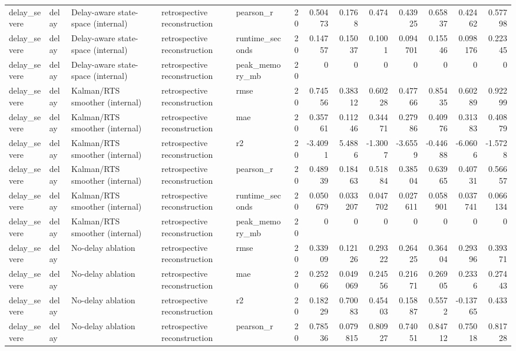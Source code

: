 \begin{table}[!htbp]
{{\begin{tabular}{lllllrrrrrrrr}
delay_severe & delay & Delay-aware state-space (internal) & retrospective reconstruction & pearson_r & 20 & 0.50473 & 0.1768 & 0.474 & 0.43925 & 0.65837 & 0.42462 & 0.57798 \\
delay_severe & delay & Delay-aware state-space (internal) & retrospective reconstruction & runtime_seconds & 20 & 0.14757 & 0.15037 & 0.1001 & 0.094701 & 0.15546 & 0.098176 & 0.22345 \\
delay_severe & delay & Delay-aware state-space (internal) & retrospective reconstruction & peak_memory_mb & 20 & 0 & 0 & 0 & 0 & 0 & 0 & 0 \\
delay_severe & delay & Kalman/RTS smoother (internal) & retrospective reconstruction & rmse & 20 & 0.74556 & 0.38312 & 0.60228 & 0.47766 & 0.85435 & 0.60289 & 0.92299 \\
delay_severe & delay & Kalman/RTS smoother (internal) & retrospective reconstruction & mae & 20 & 0.35761 & 0.11246 & 0.34471 & 0.27986 & 0.40976 & 0.31383 & 0.40879 \\
delay_severe & delay & Kalman/RTS smoother (internal) & retrospective reconstruction & r2 & 20 & -3.4091 & 5.4886 & -1.3007 & -3.6559 & -0.44688 & -6.0606 & -1.5728 \\
delay_severe & delay & Kalman/RTS smoother (internal) & retrospective reconstruction & pearson_r & 20 & 0.48939 & 0.18463 & 0.51884 & 0.38504 & 0.63965 & 0.40731 & 0.56657 \\
delay_severe & delay & Kalman/RTS smoother (internal) & retrospective reconstruction & runtime_seconds & 20 & 0.050679 & 0.033207 & 0.047702 & 0.027611 & 0.058901 & 0.037741 & 0.066134 \\
delay_severe & delay & Kalman/RTS smoother (internal) & retrospective reconstruction & peak_memory_mb & 20 & 0 & 0 & 0 & 0 & 0 & 0 & 0 \\
delay_severe & delay & No-delay ablation & retrospective reconstruction & rmse & 20 & 0.33909 & 0.12126 & 0.29322 & 0.26425 & 0.36404 & 0.29396 & 0.39371 \\
delay_severe & delay & No-delay ablation & retrospective reconstruction & mae & 20 & 0.25266 & 0.049069 & 0.24556 & 0.21671 & 0.26905 & 0.2336 & 0.27443 \\
delay_severe & delay & No-delay ablation & retrospective reconstruction & r2 & 20 & 0.18229 & 0.70083 & 0.45403 & 0.15887 & 0.5572 & -0.13765 & 0.433 \\
delay_severe & delay & No-delay ablation & retrospective reconstruction & pearson_r & 20 & 0.78536 & 0.079815 & 0.80927 & 0.74051 & 0.84712 & 0.75018 & 0.81728 \\

\end{tabular}}}
\end{table}
